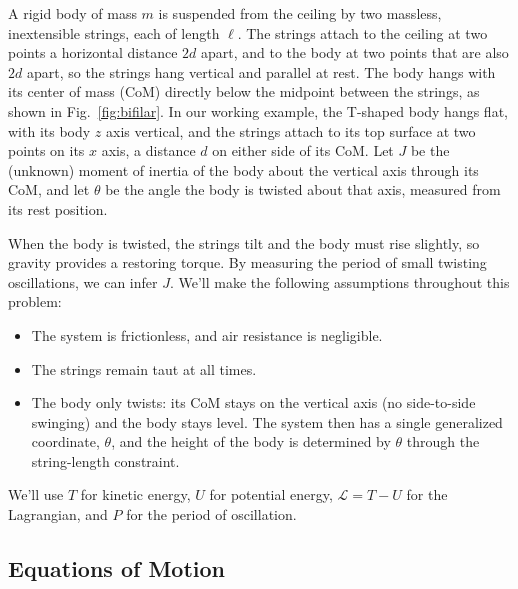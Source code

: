 \documentclass[11pt,letterpaper]{article}
\begin{document}
A rigid body of mass $m$ is suspended from the ceiling by two massless, inextensible strings, each of length $\ell$. The strings attach to the ceiling at two points a horizontal distance $2d$ apart, and to the body at two points that are also $2d$ apart, so the strings hang vertical and parallel at rest. The body hangs with its center of mass (CoM) directly below the midpoint between the strings, as shown in Fig.~\ref{fig:bifilar}. In our working example, the T-shaped body hangs flat, with its body $z$ axis vertical, and the strings attach to its top surface at two points on its $x$ axis, a distance $d$ on either side of its CoM. Let $J$ be the (unknown) moment of inertia of the body about the vertical axis through its CoM, and let $\theta$ be the angle the body is twisted about that axis, measured from its rest position.

When the body is twisted, the strings tilt and the body must rise slightly, so gravity provides a restoring torque. By measuring the period of small twisting oscillations, we can infer $J$. We'll make the following assumptions throughout this problem:
\begin{itemize}
    \item The system is frictionless, and air resistance is negligible.
    \item The strings remain taut at all times.
    \item The body only twists: its CoM stays on the vertical axis (no side-to-side swinging) and the body stays level. The system then has a single generalized coordinate, $\theta$, and the height of the body is determined by $\theta$ through the string-length constraint.
\end{itemize}
We'll use $T$ for kinetic energy, $U$ for potential energy, $\mathcal{L} = T - U$ for the Lagrangian, and $P$ for the period of oscillation.

\subsection*{Equations of Motion}
\end{document}
